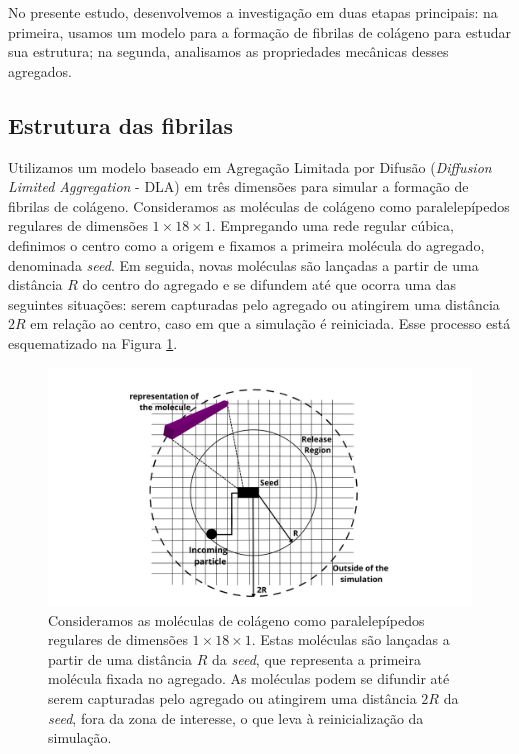 \documentclass{article}
\begin{document}
    No presente estudo, desenvolvemos a investigação em duas etapas principais: na primeira, usamos um modelo para a formação de 
    fibrilas de colágeno para estudar sua estrutura; na segunda, analisamos as propriedades mecânicas desses agregados. 

    \subsection{Estrutura das fibrilas}

    Utilizamos um modelo baseado em Agregação Limitada por Difusão (\textit{Diffusion Limited Aggregation} - DLA) \cite{Witten1983} 
    em três dimensões para simular a formação de fibrilas de colágeno. Consideramos as moléculas de colágeno como paralelepípedos 
    regulares de dimensões \(1 \times 18 \times 1\). Empregando uma rede regular cúbica, definimos o centro como a origem e fixamos 
    a primeira molécula do agregado, denominada \textit{seed}. Em seguida, novas moléculas são lançadas a partir de uma distância 
    \(R\) do centro do agregado e se difundem até que ocorra uma das seguintes situações: serem capturadas pelo agregado ou atingirem 
    uma distância \(2R\) em relação ao centro, caso em que a simulação é reiniciada. Esse processo está esquematizado na Figura \ref{M1}. 

        \begin{figure}[H]
            \centering
            \includegraphics[width=\textwidth]{figures/DLA.png}
    
            \caption{Consideramos as moléculas de colágeno como paralelepípedos regulares de dimensões \(1 \times 18 \times 1\). 
            Estas moléculas são lançadas a partir de uma distância \(R\) da \textit{seed}, que representa a primeira molécula fixada 
            no agregado. As moléculas podem se difundir até serem capturadas pelo agregado ou atingirem uma distância \(2R\) da \textit{seed}, 
            fora da zona de interesse, o que leva à reinicialização da simulação.} 
    
            \label{M1}
        \end{figure}
    
\end{document}
